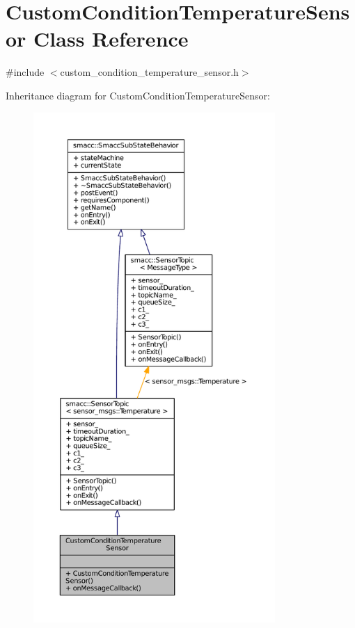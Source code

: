 \hypertarget{classCustomConditionTemperatureSensor}{}\section{Custom\+Condition\+Temperature\+Sensor Class Reference}
\label{classCustomConditionTemperatureSensor}


{\ttfamily \#include $<$custom\+\_\+condition\+\_\+temperature\+\_\+sensor.\+h$>$}



Inheritance diagram for Custom\+Condition\+Temperature\+Sensor\+:
\nopagebreak
\begin{figure}[H]
\begin{center}
\leavevmode
\includegraphics[height=550pt]{classCustomConditionTemperatureSensor__inherit__graph}
\end{center}
\end{figure}


